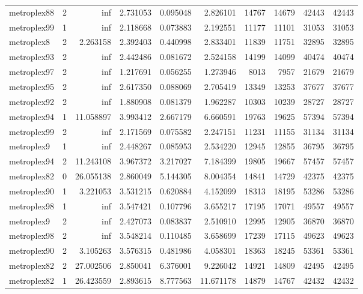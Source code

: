 \begin{longtable}{|l|r|r|r|r|r|r|r|r|r|}
metroplex88 & 2 & inf & 2.731053 & 0.095048 & 2.826101 & 14767 & 14679 & 42443 & 42443 \\
metroplex99 & 1 & inf & 2.118668 & 0.073883 & 2.192551 & 11177 & 11101 & 31053 & 31053 \\
metroplex8 & 2 & 2.263158 & 2.392403 & 0.440998 & 2.833401 & 11839 & 11751 & 32895 & 32895 \\
metroplex93 & 2 & inf & 2.442486 & 0.081672 & 2.524158 & 14199 & 14099 & 40474 & 40474 \\
metroplex97 & 2 & inf & 1.217691 & 0.056255 & 1.273946 & 8013 & 7957 & 21679 & 21679 \\
metroplex95 & 2 & inf & 2.617350 & 0.088069 & 2.705419 & 13349 & 13253 & 37677 & 37677 \\
metroplex92 & 2 & inf & 1.880908 & 0.081379 & 1.962287 & 10303 & 10239 & 28727 & 28727 \\
metroplex94 & 1 & 11.058897 & 3.993412 & 2.667179 & 6.660591 & 19763 & 19625 & 57394 & 57394 \\
metroplex99 & 2 & inf & 2.171569 & 0.075582 & 2.247151 & 11231 & 11155 & 31134 & 31134 \\
metroplex9 & 1 & inf & 2.448267 & 0.085953 & 2.534220 & 12945 & 12855 & 36795 & 36795 \\
metroplex94 & 2 & 11.243108 & 3.967372 & 3.217027 & 7.184399 & 19805 & 19667 & 57457 & 57457 \\
metroplex82 & 0 & 26.055138 & 2.860049 & 5.144305 & 8.004354 & 14841 & 14729 & 42375 & 42375 \\
metroplex90 & 1 & 3.221053 & 3.531215 & 0.620884 & 4.152099 & 18313 & 18195 & 53286 & 53286 \\
metroplex98 & 1 & inf & 3.547421 & 0.107796 & 3.655217 & 17195 & 17071 & 49557 & 49557 \\
metroplex9 & 2 & inf & 2.427073 & 0.083837 & 2.510910 & 12995 & 12905 & 36870 & 36870 \\
metroplex98 & 2 & inf & 3.548214 & 0.110485 & 3.658699 & 17239 & 17115 & 49623 & 49623 \\
metroplex90 & 2 & 3.105263 & 3.576315 & 0.481986 & 4.058301 & 18363 & 18245 & 53361 & 53361 \\
metroplex82 & 2 & 27.002506 & 2.850041 & 6.376001 & 9.226042 & 14921 & 14809 & 42495 & 42495 \\
metroplex82 & 1 & 26.423559 & 2.893615 & 8.777563 & 11.671178 & 14879 & 14767 & 42432 & 42432 \\
\end{longtable}
